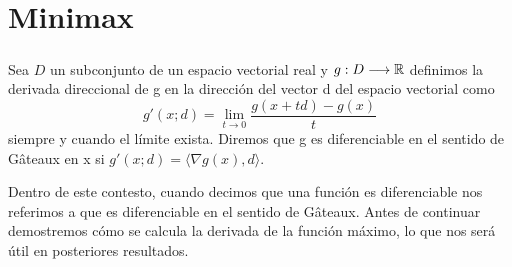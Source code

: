 \chapter{Minimax}
		\newcommand{\barx}{\bar{x} }
		\newcommand{\dd}{\textbf{\emph{d}}}
	\paragraph{}
	
	\begin{definicion}
			Sea $ D $ un subconjunto de un espacio vectorial real y $ g: D \longrightarrow  \mathbb{R}$ definimos la derivada direccional de g en la dirección del vector d del espacio vectorial como
			\[
			g'(x;d) = \lim_{t\rightarrow0}\frac{g(x+td) - g(x)}{t}
			\]
			siempre y cuando el límite exista. Diremos que g es diferenciable en el sentido de Gâteaux en x si $ g'(x;d) = \langle \nabla g(x), d\rangle $.
	\end{definicion}

	Dentro de este contesto, cuando decimos que una función es diferenciable nos referimos a que es diferenciable en el sentido de Gâteaux. Antes de continuar demostremos cómo se calcula la derivada de la función máximo, lo que nos será útil en posteriores resultados.
	
